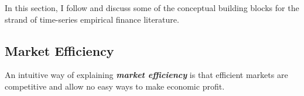 In this section, I follow \citet[Chapter~5]{campbell2017financial} and discuss some 
of the conceptual building blocks for the strand of time-series empirical finance literature.

\subsection{Market Efficiency}
An intuitive way of explaining \textbf{\textit{market efficiency}} is that efficient markets
are competitive and allow no easy ways to make economic profit. 
